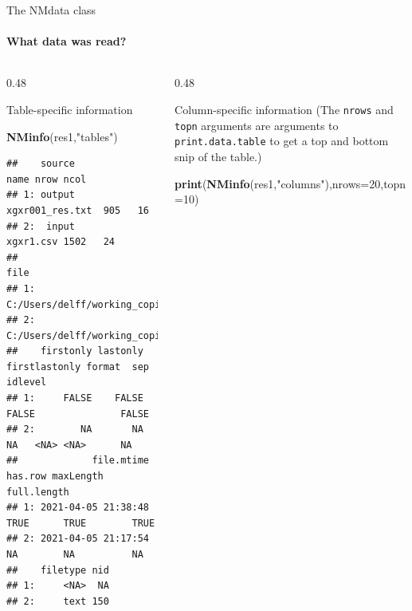\documentclass[
  8pt,
  ignorenonframetext,
  aspectratio=169]{beamer}
\newenvironment{Shaded}{\begin{snugshade}}{\end{snugshade}}
\newcommand{\DataTypeTok}[1]{\textcolor[rgb]{0.13,0.29,0.53}{#1}}
\newcommand{\DecValTok}[1]{\textcolor[rgb]{0.00,0.00,0.81}{#1}}
\newcommand{\KeywordTok}[1]{\textcolor[rgb]{0.13,0.29,0.53}{\textbf{#1}}}
\newcommand{\NormalTok}[1]{#1}
\newcommand{\StringTok}[1]{\textcolor[rgb]{0.31,0.60,0.02}{#1}}
\begin{document}
\begin{frame}[fragile]{The NMdata class}
\protect\hypertarget{the-nmdata-class-1}{}
\framesubtitle{What data was read?}

\begin{columns}[T]
\begin{column}{0.48\textwidth}
\begin{block}{Table-specific information}
\protect\hypertarget{table-specific-information}{}
\scriptsize

\begin{Shaded}
\begin{Highlighting}[]
\KeywordTok{NMinfo}\NormalTok{(res1,}\StringTok{"tables"}\NormalTok{)}
\end{Highlighting}
\end{Shaded}

\begin{verbatim}
##    source            name nrow ncol
## 1: output xgxr001_res.txt  905   16
## 2:  input       xgxr1.csv 1502   24
##                                                                         file
## 1: C:/Users/delff/working_copies/NMdata/inst/examples/nonmem/xgxr001_res.txt
## 2:         C:/Users/delff/working_copies/NMdata/inst/examples/data/xgxr1.csv
##    firstonly lastonly firstlastonly format  sep idlevel
## 1:     FALSE    FALSE         FALSE               FALSE
## 2:        NA       NA            NA   <NA> <NA>      NA
##             file.mtime has.row maxLength full.length
## 1: 2021-04-05 21:38:48    TRUE      TRUE        TRUE
## 2: 2021-04-05 21:17:54      NA        NA          NA
##    filetype nid
## 1:     <NA>  NA
## 2:     text 150
\end{verbatim}
\end{block}
\end{column}

\begin{column}{0.48\textwidth}
\begin{block}{Column-specific information}
\protect\hypertarget{column-specific-information}{}
(The \texttt{nrows} and \texttt{topn} arguments are arguments to
\texttt{print.data.table} to get a top and bottom snip of the table.)
\footnotesize

\begin{Shaded}
\begin{Highlighting}[]
\KeywordTok{print}\NormalTok{(}\KeywordTok{NMinfo}\NormalTok{(res1,}\StringTok{"columns"}\NormalTok{),}\DataTypeTok{nrows=}\DecValTok{20}\NormalTok{,}\DataTypeTok{topn=}\DecValTok{10}\NormalTok{)}
\end{Highlighting}
\end{Shaded}


\end{block}
\end{column}
\end{columns}
\end{frame}
\end{document}
